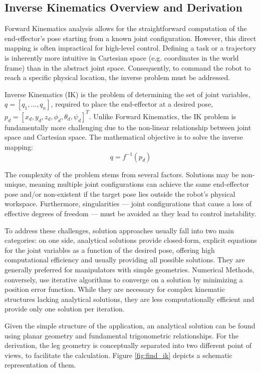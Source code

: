 \subsection{Inverse Kinematics Overview and Derivation}

Forward Kinematics analysis allows for the straightforward computation of the end-effector's pose starting from a
known joint configuration. However, this direct mapping is often impractical for high-level control. Defining a
task or a trajectory is inherently more intuitive in Cartesian space (e.g. coordinates in the world frame) than
in the abstract joint space. Consequently, to command the robot to reach a specific physical location, the
inverse problem must be addressed.

Inverse Kinematics (IK) \cite{siciliano2009robotics} is the problem of determining the set of joint variables,
$q = [q_1, \dots, q_n]$, required to place the end-effector at a desired pose, $p_d = [x_d, y_d, z_d, \phi_d, \theta_d, \psi_d]^T$.
Unlike Forward Kinematics, the IK problem is fundamentally more challenging due to the non-linear relationship
between joint space and Cartesian space. The mathematical objective is to solve the inverse mapping:
\begin{equation*}
    q = f^{-1}(p_d)
\end{equation*}

The complexity of the problem stems from several factors. Solutions may be non-unique, meaning multiple
joint configurations can achieve the same end-effector pose and/or non-existent if the target pose lies outside
the robot's physical workspace. Furthermore, singularities — joint configurations that cause a loss of effective
degrees of freedom — must be avoided as they lead to control instability.

To address these challenges, solution approaches usually fall into two main categories: on one side, analytical
solutions provide closed-form, explicit equations for the joint variables as a function of the desired pose,
offering high computational efficiency and usually providing all possible solutions. They are generally preferred
for manipulators with simple geometries. Numerical Methods, conversely, use iterative algorithms to converge on a
solution by minimizing a position error function. While they are necessary for complex kinematic structures
lacking analytical solutions, they are less computationally efficient and provide only one solution per iteration.

Given the simple structure of the application, an analytical solution can be found using planar geometry and
fundamental trigonometric relationships. For the derivation, the leg geometry is conceptually separated into two
different point of views, to facilitate the calculation. Figure \ref{fig:find_ik} depicts a schematic representation
of them.

